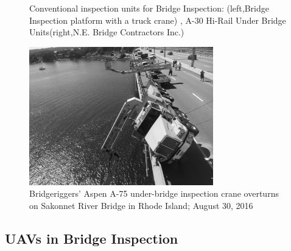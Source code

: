 \documentclass[12pt]{report}
\begin{document}
\begin{figure}[htp]
	\centering 
	\caption{Conventional inspection units for Bridge Inspection: (left,Bridge Inspection platform with a truck crane) , A-30 Hi-Rail Under Bridge Units(right,N.E. Bridge Contractors Inc.)}
   \label{fig:bridge_inspection}
\end{figure}

\begin{figure}[htp]
	\centering 
    \includegraphics[width=8cm]{tip.jpg}
	\caption{Bridgeriggers' Aspen A-75 under-bridge inspection crane overturns on Sakonnet River Bridge in Rhode Island; August 30, 2016}
   \label{fig:bridge_fail}
\end{figure}

\subsection{UAVs in Bridge Inspection}
\end{document}
